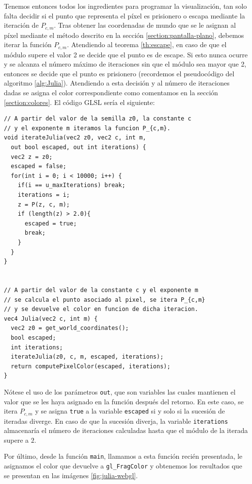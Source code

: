 Tenemos entonces todos los ingredientes para programar la visualización, tan solo falta decidir si el punto que representa el píxel es prisionero o escapa mediante la iteración de $P_{c,m}$. Tras obtener las coordenadas de mundo que se le asignan al píxel mediante el método descrito en la sección \ref{section:pantalla-plano}, debemos iterar la función $P_{c,m}$. Atendiendo al teorema \ref{th:escape}, en caso de que el módulo supere el valor 2 se decide que el punto es de escape. Si esto nunca ocurre y se alcanza el número máximo de iteraciones sin que el módulo sea mayor que 2, entonces se decide que el punto es prisionero (recordemos el pseudocódigo del algoritmo \ref{alg:Julia}). Atendiendo a esta decisión y al número de iteraciones dadas se asigna el color correspondiente como comentamos en la sección \ref{section:colores}. El código GLSL sería el siguiente:

\begin{lstlisting}
// A partir del valor de la semilla z0, la constante c 
// y el exponente m iteramos la funcion P_{c,m}.
void iterateJulia(vec2 z0, vec2 c, int m, 
  out bool escaped, out int iterations) {  
  vec2 z = z0;
  escaped = false;
  for(int i = 0; i < 10000; i++) {
    if(i == u_maxIterations) break;
    iterations = i;
    z = P(z, c, m);
    if (length(z) > 2.0){
      escaped = true;
      break;
    }
  }
}


// A partir del valor de la constante c y el exponente m
// se calcula el punto asociado al pixel, se itera P_{c,m}
// y se devuelve el color en funcion de dicha iteracion.
vec4 Julia(vec2 c, int m) {
  vec2 z0 = get_world_coordinates();
  bool escaped;
  int iterations;
  iterateJulia(z0, c, m, escaped, iterations);
  return computePixelColor(escaped, iterations);
}
\end{lstlisting}

Nótese el uso de los parámetros \verb|out|, que son variables las cuales mantienen el valor que se les haya asignado en la función después del retorno. En este caso, se itera $P_{c,m}$ y se asigna \verb|true| a la variable \verb|escaped| si y solo si la sucesión de iteradas diverge. En caso de que la sucesión diverja, la variable \verb|iterations| almacenaría el número de iteraciones calculadas hasta que el módulo de la iterada supere a $2$. 

Por último, desde la función \verb|main|, llamamos a esta función recién presentada, le asignamos el color que devuelve a \verb|gl_FragColor| y obtenemos los resultados que se presentan en las imágenes \ref{fig:julia-webgl}.  

